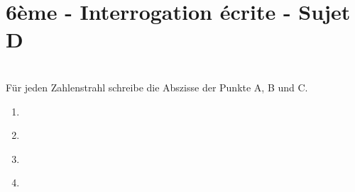 



\section*{6\`eme - Interrogation \'{e}crite - Sujet D}

\\
F\"ur jeden Zahlenstrahl schreibe die Abszisse der Punkte A, B und C.
\begin{enumerate}
\item
\begin{minipage}{18cm}
\begin{DroiteGraduee}[none]{15}{0}{7}{5}{1}{0}{0}
\end{DroiteGraduee}
\end{minipage}

\item
\begin{minipage}{18cm}
\begin{DroiteGraduee}[none]{15}{0}{7}{10}{1}{0}{0}
\end{DroiteGraduee}
\end{minipage}

\item
\begin{minipage}{18cm}
\begin{DroiteGraduee}[none]{15}{0}{5}{10}{1}{0.08}{0}
\end{DroiteGraduee}
\end{minipage}

\item
\begin{minipage}{18cm}
\begin{DroiteGraduee}[none]{15}{0}{2}{10}{1}{0}{0}
\end{DroiteGraduee}
\end{minipage}
\end{enumerate}

